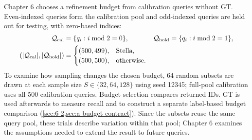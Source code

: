 Chapter 6 chooses a refinement budget from calibration queries without GT.
Even-indexed queries form the calibration pool and odd-indexed queries
are held out for testing, with zero-based indices:
\[
 \begin{aligned}
 \mathcal Q_{\rm cal}&=\{q_i:i\bmod2=0\},&
 \mathcal Q_{\rm hold}&=\{q_i:i\bmod2=1\},\\
 (|\mathcal Q_{\rm cal}|,|\mathcal Q_{\rm hold}|)
 &=\begin{cases}(500,499),&\text{Stella},\\(500,500),&\text{otherwise}.\end{cases}
 \end{aligned}
 \]
To examine how sampling changes the chosen budget, 64 random subsets
are drawn at each sample size $S\in\{32,64,128\}$ using seed 12345;
full-pool calibration uses all 500 calibration queries. Budget
selection compares returned IDs. GT is used afterwards to measure recall
and to construct a separate label-based budget comparison
(\cref{sec:6-2,sec:a-budget-contract}). Since the subsets reuse the same
query pool, these trials describe variation within that pool; Chapter 6
examines the assumptions needed to extend the result to future queries.
